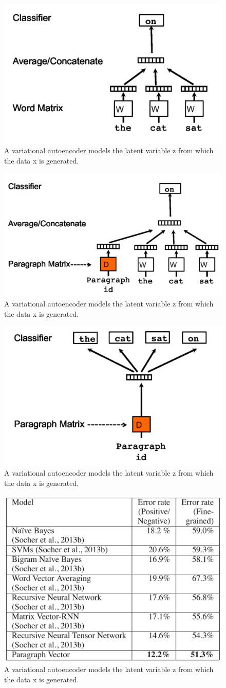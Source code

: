 \begin{figure}
\centering
  \includegraphics[width=.5\linewidth]{files/doc2vec-1.png}
  \caption{A variational autoencoder models the latent variable z from which the data x is generated.}
  \label{fig:vae}
\end{figure}

\begin{figure}
\centering
  \includegraphics[width=.5\linewidth]{files/doc2vec-2.png}
  \caption{A variational autoencoder models the latent variable z from which the data x is generated.}
  \label{fig:vae}
\end{figure}

\begin{figure}
\centering
  \includegraphics[width=.5\linewidth]{files/doc2vec-3.png}
  \caption{A variational autoencoder models the latent variable z from which the data x is generated.}
  \label{fig:vae}
\end{figure}

\begin{figure}
\centering
  \includegraphics[width=.5\linewidth]{files/doc2vec-4.png}
  \caption{A variational autoencoder models the latent variable z from which the data x is generated.}
  \label{fig:vae}
\end{figure}

